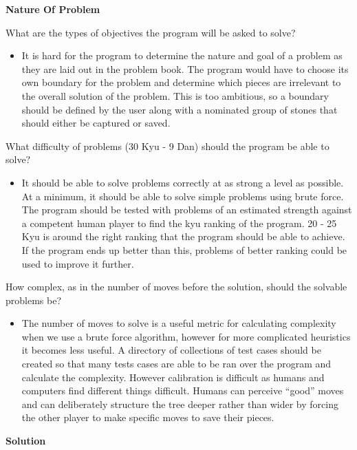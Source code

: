 \documentclass{l3proj}
\begin{document}
\textbf{Nature Of Problem}

What are the types of objectives the program will be asked to solve?
\begin{itemize}
\item It is hard for the program to determine the nature and goal of a problem as they are laid out in the problem book.  The program would have to choose its own boundary for the problem and determine which pieces are irrelevant to the overall solution of the problem.  This is too ambitious, so a boundary should be defined by the user along with a nominated group of stones that should either be captured or saved.
\end{itemize}
What difficulty of problems (30 Kyu - 9 Dan) should the program be able to solve?
\begin{itemize}
\item It should be able to solve problems correctly at as strong a level as possible.  At a minimum, it should be able to solve simple problems using brute force.  The program should be tested with problems of an estimated strength against a competent human player to find the kyu ranking of the program.  20 - 25 Kyu is around the right ranking that the program should be able to achieve.  If the program ends up better than this, problems of better ranking could be used to improve it further.
\end{itemize}
How complex, as in the number of moves before the solution, should the solvable problems be?
\begin{itemize}
\item The number of moves to solve is a useful metric for calculating complexity when we use a brute force algorithm, however for more complicated heuristics it becomes less useful.  A directory of collections of test cases should be created so that many tests cases are able to be ran over the program and calculate the complexity.  However calibration is difficult as humans and computers find different things difficult.  Humans can perceive “good” moves and can deliberately structure the tree deeper rather than wider by forcing the other player to make specific moves to save their pieces.
\end{itemize}

\textbf{Solution}
\end{document}
